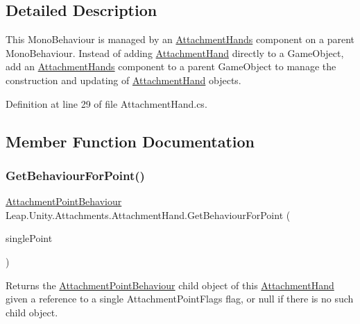\subsection{Detailed Description}
This Mono\+Behaviour is managed by an \mbox{\hyperlink{class_leap_1_1_unity_1_1_attachments_1_1_attachment_hands}{Attachment\+Hands}} component on a parent Mono\+Behaviour. Instead of adding \mbox{\hyperlink{class_leap_1_1_unity_1_1_attachments_1_1_attachment_hand}{Attachment\+Hand}} directly to a Game\+Object, add an \mbox{\hyperlink{class_leap_1_1_unity_1_1_attachments_1_1_attachment_hands}{Attachment\+Hands}} component to a parent Game\+Object to manage the construction and updating of \mbox{\hyperlink{class_leap_1_1_unity_1_1_attachments_1_1_attachment_hand}{Attachment\+Hand}} objects. 



Definition at line 29 of file Attachment\+Hand.\+cs.



\subsection{Member Function Documentation}
\mbox{\label{class_leap_1_1_unity_1_1_attachments_1_1_attachment_hand_a1a0809e8733aa114684f28e6e31f37c5}} 
\subsubsection{\texorpdfstring{GetBehaviourForPoint()}{GetBehaviourForPoint()}}
{\footnotesize\ttfamily \mbox{\hyperlink{class_leap_1_1_unity_1_1_attachments_1_1_attachment_point_behaviour}{Attachment\+Point\+Behaviour}} Leap.\+Unity.\+Attachments.\+Attachment\+Hand.\+Get\+Behaviour\+For\+Point (\begin{DoxyParamCaption}\item[{\mbox{\hyperlink{namespace_leap_1_1_unity_1_1_attachments_a4b32b38f722ad110fcd5a817256e09ab}{Attachment\+Point\+Flags}}}]{single\+Point }\end{DoxyParamCaption})}



Returns the \mbox{\hyperlink{class_leap_1_1_unity_1_1_attachments_1_1_attachment_point_behaviour}{Attachment\+Point\+Behaviour}} child object of this \mbox{\hyperlink{class_leap_1_1_unity_1_1_attachments_1_1_attachment_hand}{Attachment\+Hand}} given a reference to a single Attachment\+Point\+Flags flag, or null if there is no such child object. 




